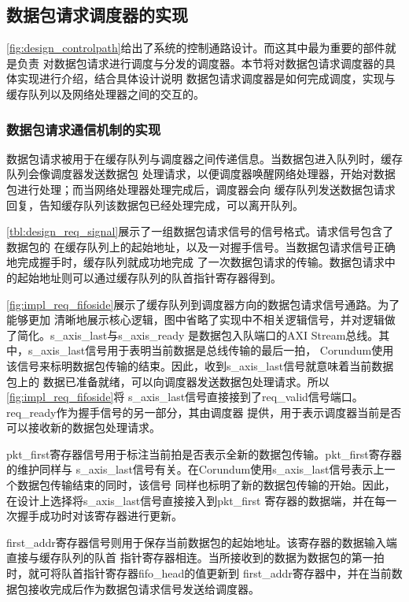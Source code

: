 \subsection{数据包请求调度器的实现}

\autoref{fig:design_controlpath}给出了系统的控制通路设计。而这其中最为重要的部件就是负责
对数据包请求进行调度与分发的调度器。本节将对数据包请求调度器的具体实现进行介绍，结合具体设计说明
数据包请求调度器是如何完成调度，实现与缓存队列以及网络处理器之间的交互的。

\subsubsection{数据包请求通信机制的实现}

数据包请求被用于在缓存队列与调度器之间传递信息。当数据包进入队列时，缓存队列会像调度器发送数据包
处理请求，以便调度器唤醒网络处理器，开始对数据包进行处理；而当网络处理器处理完成后，调度器会向
缓存队列发送数据包请求回复，告知缓存队列该数据包已经处理完成，可以离开队列。

\autoref{tbl:design_req_signal}展示了一组数据包请求信号的信号格式。请求信号包含了数据包的
在缓存队列上的起始地址，以及一对握手信号。当数据包请求信号正确地完成握手时，缓存队列就成功地完成
了一次数据包请求的传输。数据包请求中的起始地址则可以通过缓存队列的队首指针寄存器得到。


\autoref{fig:impl_req_fifoside}展示了缓存队列到调度器方向的数据包请求信号通路。为了能够更加
清晰地展示核心逻辑，图中省略了实现中不相关逻辑信号，并对逻辑做了简化。s\_axis\_last与s\_axis\_ready
是数据包入队端口的AXI Stream总线。其中，s\_axis\_last信号用于表明当前数据是总线传输的最后一拍\cite{arm2011axi}，
Corundum使用该信号来标明数据包传输的结束。因此，收到s\_axis\_last信号就意味着当前数据包上的
数据已准备就绪，可以向调度器发送数据包处理请求。所以\autoref{fig:impl_req_fifoside}将
s\_axis\_last信号直接接到了req\_valid信号端口。req\_ready作为握手信号的另一部分，其由调度器
提供，用于表示调度器当前是否可以接收新的数据包处理请求。

pkt\_first寄存器信号用于标注当前拍是否表示全新的数据包传输。pkt\_first寄存器的维护同样与
s\_axis\_last信号有关。在Corundum使用s\_axis\_last信号表示上一个数据包传输结束的同时，该信号
同样也标明了新的数据包传输的开始。因此，在设计上选择将s\_axis\_last信号直接接入到pkt\_first
寄存器的数据端，并在每一次握手成功时对该寄存器进行更新。

first\_addr寄存器信号则用于保存当前数据包的起始地址。该寄存器的数据输入端直接与缓存队列的队首
指针寄存器相连。当所接收到的数据为数据包的第一拍时，就可将队首指针寄存器fifo\_head的值更新到
first\_addr寄存器中，并在当前数据包接收完成后作为数据包请求信号发送给调度器。


